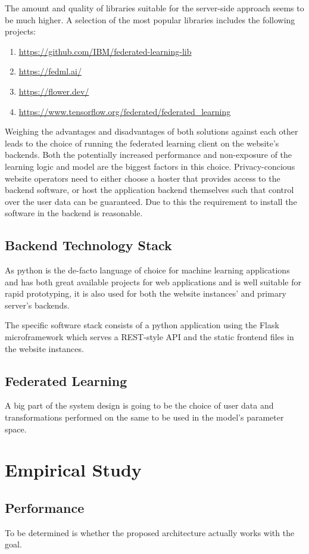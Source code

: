 \documentclass[
    fontsize=12pt,
    headings=small,
    parskip=half,           %
    bibliography=totoc,
    numbers=noenddot,       %
    open=any,               %
    final                   %
    ]{scrreprt}
\begin{document}
The amount and quality of libraries suitable for the server-side approach seems to be much higher. A selection of the most popular libraries includes the following projects:

\begin{enumerate}
	\item \url{https://github.com/IBM/federated-learning-lib}
	\item \url{https://fedml.ai/}
	\item \url{https://flower.dev/}
	\item \url{https://www.tensorflow.org/federated/federated_learning}
\end{enumerate}

Weighing the advantages and disadvantages of both solutions against each other leads to the choice of running the federated learning client on the website's backends. Both the potentially increased performance and non-exposure of the learning logic and model are the biggest factors in this choice. Privacy-concious website operators need to either choose a hoster that provides access to the backend software, or host the application backend themselves such that control over the user data can be guaranteed. Due to this the requirement to install the software in the backend is reasonable.

\section{Backend Technology Stack}

As python is the de-facto language of choice for machine learning applications and has both great available projects for web applications and is well suitable for rapid prototyping, it is also used for both the website instances' and primary server's backends.

The specific software stack consists of a python application using the Flask microframework which serves a REST-style API and the static frontend files in the website instances.


\section{Federated Learning}

A big part of the system design is going to be the choice of user data and transformations performed on the same to be used in the model's parameter space.


\chapter{Empirical Study}

\section{Performance}

To be determined is whether the proposed architecture actually works with the goal.

\fi


\begin{raggedright}
  \printbibliography
\end{raggedright}
\end{document}
